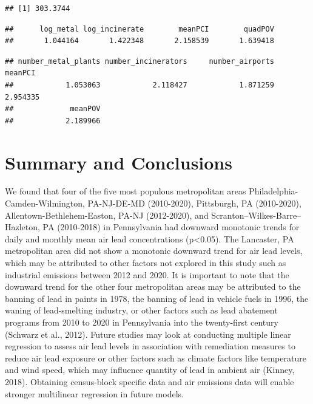 \documentclass[
  12pt,
]{article}
\begin{document}
\begin{verbatim}
## [1] 303.3744
\end{verbatim}

\begin{verbatim}
##      log_metal log_incinerate        meanPCI        quadPOV 
##       1.044164       1.422348       2.158539       1.639418
\end{verbatim}

\begin{verbatim}
## number_metal_plants number_incinerators     number_airports             meanPCI 
##            1.053063            2.118427            1.871259            2.954335 
##             meanPOV 
##            2.189966
\end{verbatim}

\newpage

\hypertarget{summary-and-conclusions}{%
\section{Summary and Conclusions}\label{summary-and-conclusions}}

We found that four of the five most populous metropolitan areas
Philadelphia-Camden-Wilmington, PA-NJ-DE-MD (2010-2020), Pittsburgh, PA
(2010-2020), Allentown-Bethlehem-Easton, PA-NJ (2012-2020), and
Scranton--Wilkes-Barre--Hazleton, PA (2010-2018) in Pennsylvania had
downward monotonic trends for daily and monthly mean air lead
concentrations (p\textless0.05). The Lancaster, PA metropolitan area did
not show a monotonic downward trend for air lead levels, which may be
attributed to other factors not explored in this study such as
industrial emissions between 2012 and 2020. It is important to note that
the downward trend for the other four metropolitan areas may be
attributed to the banning of lead in paints in 1978, the banning of lead
in vehicle fuels in 1996, the waning of lead-smelting industry, or other
factors such as lead abatement programs from 2010 to 2020 in
Pennsylvania into the twenty-first century (Schwarz et al., 2012).
Future studies may look at conducting multiple linear regression to
assess air lead levels in association with remediation measures to
reduce air lead exposure or other factors such as climate factors like
temperature and wind speed, which may influence quantity of lead in
ambient air (Kinney, 2018). Obtaining census-block specific data and air
emissions data will enable stronger multilinear regression in future
models.

\newpage
\end{document}
